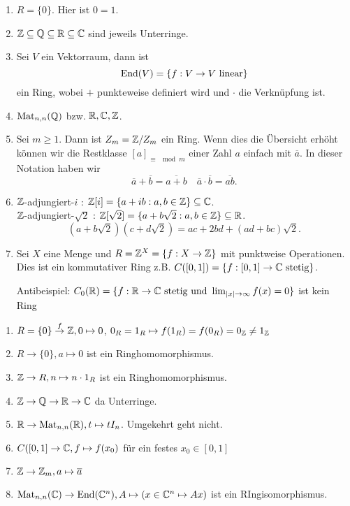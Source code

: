 \begin{eg}[Ringe]
	\begin{enumerate}[(1)]
		\item $R = \{0\}$. Hier ist $0 = 1$.
		\item $\mathbb{Z} \subseteq \mathbb{Q} \subseteq \mathbb{R} \subseteq \mathbb{C}$ sind jeweils Unterringe.
		\item Sei $V$ ein Vektorraum, dann ist
			\[
				\operatorname{End}(V) = \{f: V \to V \text{ linear}\} 
			\] 
			ein Ring, wobei $+$ punkteweise definiert wird und $\cdot$ die Verknüpfung ist.
		\item $\operatorname{Mat}_{n,n}(\mathbb{Q})$ bzw. $\mathbb{R},\mathbb{C},\mathbb{Z}$.
		\item Sei $m \geq 1$. Dann ist $Z_{m} = \mathbb{Z} / Z_{m}$ ein Ring.
			Wenn dies die Übersicht erhöht können wir die Restklasse $[a]_{\equiv \mod m}$ einer Zahl $a$ einfach mit $\overline{a}$. In dieser Notation haben wir
			\[
			\overline{a}+ \overline{b} = \overline{a+b} \quad \overline{a} \cdot \overline{b} = \overline{ab}
			.\]
		\item $\mathbb{Z}$-adjungiert-$i$ : $\mathbb{Z}[i] = \{a+ib: a,b \in \mathbb{Z}\} \subseteq \mathbb{C}$.\\
			$\mathbb{Z}$-adjungiert-$\sqrt{2}$ : $\mathbb{Z}[\sqrt{2}] = \{a + b\sqrt{2} : a,b \in \mathbb{Z} \} \subseteq \mathbb{R}$.
			\[
				(a+b \sqrt{2} ) (c+d\sqrt{2} ) = ac + 2bd + (ad+bc)\sqrt{2} 
			.\] 
		\item Sei $X$ eine Menge und $R = \mathbb{Z}^{X} = \{f: X \to \mathbb{Z}\}$ mit punktweise Operationen. Dies ist ein kommutativer Ring
			z.B. $C([0,1]) = \{f: [0,1] \to \mathbb{C} \text{ stetig}\}$.

			Antibeispiel: $C_{0}(\mathbb{R}) = \{f: \mathbb{R} \to \mathbb{C} \text{ stetig und } \lim_{\abs{x} \to \infty} f(x) = 0\}$ ist kein Ring

	\end{enumerate}
\end{eg}

\begin{eg}[Ringhomomorphismen]
	\begin{enumerate}[(1)]
		\item $R = \{0\} \stackrel{f}{\to} \mathbb{Z}, 0 \mapsto 0$, $0_{R} = 1_{R} \mapsto f(1_{R}) = f(0_{R}) = 0_{\mathbb{Z}} \neq 1_{\mathbb{Z}}$
		\item $R \to \{0\}, a \mapsto 0$ ist ein Ringhomomorphismus.
		\item $\mathbb{Z} \to R, n \mapsto n\cdot 1_{R}$ ist ein Ringhomomorphismus.
		\item $\mathbb{Z} \to \mathbb{Q} \to \mathbb{R} \to \mathbb{C}$ da Unterringe.
		\item $\mathbb{R} \to \operatorname{Mat}_{n,n}(\mathbb{R}), t \mapsto t I_{n}$. Umgekehrt geht nicht.
		\item $C([0,1] \to \mathbb{C}, f \mapsto f(x_0)$ für ein festes $x_0 \in [0,1]$ 
		\item $\mathbb{Z} \to \mathbb{Z}_{m}, a \mapsto \overline{a}$
		\item $\operatorname{Mat}_{n,n}(\mathbb{C}) \to \operatorname{End}(\mathbb{C}^{n}), A \mapsto (x \in \mathbb{C}^{n} \mapsto A x)$ ist ein RIngisomorphismus.
	\end{enumerate}
\end{eg}

